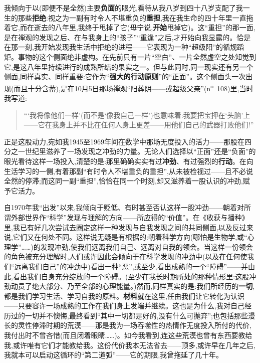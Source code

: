 我倾向于以(即便不是全然)主要\textbf{负面}的眼光,看待从我八岁到四十八岁支配了我一生的那些\textbf{拒绝}:视之为一副有时令人不堪重负的\textbf{重担},我在我生命的四十年里一直拖着它,而在逝去的八年里,我终于甩掉了它(毋宁说,\textbf{开始}甩掉它)。这“重担”的那一面,是在禅观的发现之后、在与我身上的“孩子”“重逢”之后,才开始向我显露的。恰是在那一刻,我开始发现我生活中拒绝的进程——它表现为一种“超级阳”的循规蹈矩。事物的这个侧面绝非虚构。在先前只有一片“空白”、一片全然虚空之处知觉到它,是这八年里持续进行的成熟所结的果实之一。但与此同时,同一现实还有另一个侧面,同样真实、同样重要:它作为“\textbf{强大的行动原则}”的“正面”。这个侧面头一次出现(而且十分含蓄),是在10月5日那场禅观“阳葬阴——或超级父亲”(n\textsuperscript{o}~108)里,当时我写道:

\begin{quote}
\dmark{}“‘我将像他们一样’(而不是‘像我自己一样’)也意味着:我要把宝押在‘头脑’上——它在我身上并不比在任何人身上更差——用他们自己的武器打败他们!”
\end{quote}

正是这股动力,宛如我1945至1969年间在数学中那场无度投入的活力——那股在四分之一世纪里滋养了一场发现之冲劲的力量。无论人们选择以“正面”还是“负面”的眼光看待这样一场投入,清楚的是:那里确确实实有过\textbf{冲劲}、有过强烈的\textbf{行动}。在向生活学习的一侧,有着那副“有时令人不堪重负的重担”,从未被检视过——且不必说全然的停滞;而这同一副“重担”,恰恰在同一个时刻,却又滋养着一股认识的冲劲,赋予它活力。

自1970年我“出发”以来,我倾向于贬低、有时甚至否认这样一股冲劲——朝着对所谓外部世界作“科学”发现与理解的方向——所应得的“价值”。在《收获与播种》里,我已有好几次尝试去圈定这样一种发现与自我发现之间的共同侧面,以及反过来说,它们又在何处不同。这样说无疑是有根据的:朝着科学方向(哪怕是生物学,或“心理学”……)的发现冲劲,使我们远离我们自己、远离对自我的领会。当这样一份领会的角色被充分理解时,人们或许因此会倾向于在科学发现的冲劲中(以及在任何使我们“远离我们自己”的冲劲中)看出一种“恶”,或至少,看出成熟的一个“障碍”——并由此,看出我们自身充分绽放的一个障碍。(至少在我长时期所处的那种情形里:这股冲劲动员了绝大部分、乃至全部的心理能量。)然而,同样真实的是:我们所经历的\textbf{一切},都是我们学习生活、学习自我的原料。\textbf{材料}就在这里,任由我们让它转化为认识——只要容许一场成熟的工作在我们身上发端并继续。这也是为什么,我对自己经历过的一切并不懊悔,最终看到“其中一切都是好的,没有什么可抛弃”;也包括那些漫长的灵性停滞时期的荒漠——那是我为一场吞噬性的热情作无度投入所付的代价,我付出时不曾吝惜(而且闭着眼睛……)\dmark{}。如今我看到,连这些荒漠也曾有东西要教给我,或许唯有它们才能教给我。这份代价我本无法省去——顶多,或许早在几年之后,我就本可以启动这循环的“第二道弧”——它的期限,我曾拖延了几十年。

